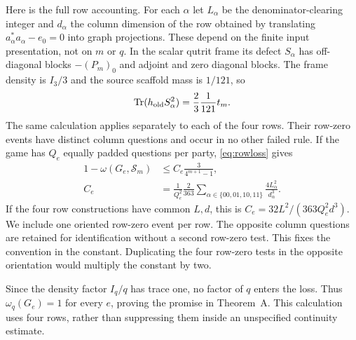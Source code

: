 Here is the full row accounting. For each $\alpha$ let $L_\alpha$ be the denominator-clearing integer and $d_\alpha$ the column dimension of the row obtained by translating $a_\alpha^*a_\alpha-e_0=0$ into graph projections. These depend on the finite input presentation, not on $m$ or $q$. In the scalar qutrit frame its defect $S_\alpha$ has off-diagonal blocks $-(P_m)_0$ and adjoint and zero diagonal blocks. The frame density is $I_3/3$ and the source scaffold mass is $1/121$, so
\begin{equation}\label{eq:defectweight}
 \operatorname{Tr}(h_{\rm old}S_\alpha^2)=\frac23\frac1{121}t_m.
\end{equation}
The same calculation applies separately to each of the four rows. Their row-zero events have distinct column questions and occur in no other failed rule. If the game has $Q_e$ equally padded questions per party, \eqref{eq:rowloss} gives
\begin{align}
 1-\omega(G_e,\mathcal S_m)
 &\leq C_e\frac{3}{4^{m+1}-1},\label{eq:valueloss}\\
 C_e&=\frac{1}{Q_e^2}\frac{2}{363}
 \sum_{\alpha\in\{00,01,10,11\}}\frac{4L_\alpha^2}{d_\alpha^3}.\label{eq:valueconstant}
\end{align}
If the four row constructions have common $L,d$, this is $C_e=32L^2/(363Q_e^2d^3)$. We include one oriented row-zero event per row. The opposite column questions are retained for identification without a second row-zero test. This fixes the convention in the constant. Duplicating the four row-zero tests in the opposite orientation would multiply the constant by two.

Since the density factor $I_q/q$ has trace one, no factor of $q$ enters the loss. Thus $\omega_q(G_e)=1$ for every $e$, proving the promise in Theorem~A. This calculation uses four rows, rather than suppressing them inside an unspecified continuity estimate.
